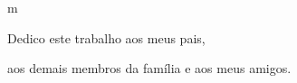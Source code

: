m\begin{dedicatoria}
  Dedico este trabalho aos meus pais,
  
  aos demais membros da família e aos meus amigos.
\end{dedicatoria}